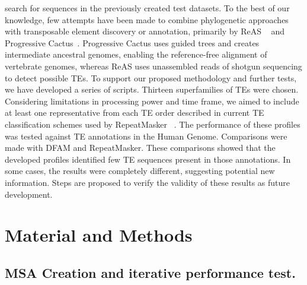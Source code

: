 \documentclass[unnumsec,webpdf,contemporary,large]{oup-authoring-template}%
\theoremstyle{thmstyleone}%
\theoremstyle{thmstyletwo}%
\theoremstyle{thmstylethree}%
\begin{document}
search for sequences in the previously created test datasets. To the best of our
knowledge, few attempts have been made to combine phylogenetic approaches with
transposable element discovery or annotation, primarily by ReAS
~\cite{li_reas_2005} and Progressive Cactus~\cite{armstrong_progressive_2020}.
Progressive Cactus uses guided trees and creates intermediate ancestral genomes,
enabling the reference-free alignment of vertebrate genomes, whereas ReAS uses
unassembled reads of shotgun sequencing to detect possible TEs. To support our
proposed methodology and further tests, we have developed a series of scripts.
Thirteen superfamilies of TEs were chosen. Considering limitations in processing
power and time frame, we aimed to include at least one representative from each
TE order described in current TE classification schemes used by RepeatMasker
~\cite{kapitonov_universal_2008}. The performance of these profiles was tested
against TE annotations in the Human Genome. Comparisons were made with DFAM and
RepeatMasker. These comparisons showed that the developed profiles identified
few TE sequences present in those annotations. In some cases, the results were
completely different, suggesting potential new information. Steps are proposed
to verify the validity of these results as future development.

\section{Material and Methods}\label{sec2} 
\subsection{MSA Creation and iterative performance test.}\label{subsec2_1}
\end{document}
